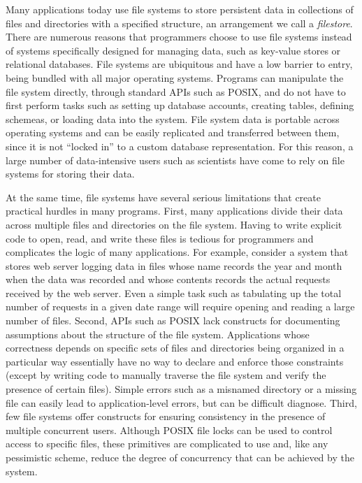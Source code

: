 %
%
Many applications today use file systems to store persistent data in
collections of files and directories with a specified structure, an
arrangement we call a \textit{filestore}. There are numerous reasons
that programmers choose to use file systems instead of systems
specifically designed for managing data, such as key-value stores or
relational databases. File systems are ubiquitous and have a low
barrier to entry, being bundled with all major operating
systems. Programs can manipulate the file system directly, through
standard APIs such as POSIX, and do not have to first perform tasks
such as setting up database accounts, creating tables, defining
schemeas, or loading data into the system. File system data is
portable across operating systems and can be easily replicated and
transferred between them, since it is not ``locked in'' to a custom
database representation. For this reason, a large number of
data-intensive users such as scientists have come to rely on file
systems for storing their data.

%
%
At the same time, file systems have several serious limitations that
create practical hurdles in many programs. First, many applications
divide their data across multiple files and directories on the file
system. Having to write explicit code to open, read, and write these
files is tedious for programmers and complicates the logic of many
applications. For example, consider a system that stores web server
logging data in files whose name records the year and month when the
data was recorded and whose contents records the actual requests
received by the web server. Even a simple task such as tabulating up
the total number of requests in a given date range will require
opening and reading a large number of files. Second, APIs such as
POSIX lack constructs for documenting assumptions about the structure
of the file system. Applications whose correctness depends on specific
sets of files and directories being organized in a particular way
essentially have no way to declare and enforce those constraints
(except by writing code to manually traverse the file system and
verify the presence of certain files). Simple errors such as a
misnamed directory or a missing file can easily lead to
application-level errors, but can be difficult diagnose. Third, few
file systems offer constructs for ensuring consistency in the presence
of multiple concurrent users. Although POSIX file locks can be used to
control access to specific files, these primitives are complicated to
use and, like any pessimistic scheme, reduce the degree of concurrency
that can be achieved by the system. 

